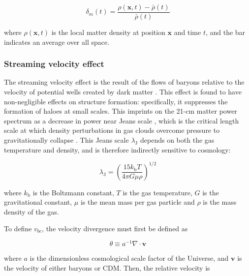 \documentclass[floats,floatfix,showpacs,amssymb,prd,superscriptaddress,nofootinbib, 11pt]{revtex4-2} %
\newcommand{\red}{\textcolor{red}}
\begin{document}
\begin{equation}
    \delta_m(t) = \frac{\rho(\textbf{x}, t) - \bar{\rho}(t)}{\bar{\rho}(t)}
    \label{eq:delta_m_definition}
\end{equation}

\noindent where $\rho(\textbf{x}, t)$ is the local matter density at position $\textbf{x}$ and time $t$, and the bar indicates an average over all space.

\subsubsection{Streaming velocity effect}
The streaming velocity effect is the result of the flows of baryons relative to the velocity of potential wells created by dark matter \citep{Tseliakhovich_Hirata_2010}. This effect is found to have non-negligible effects on structure formation: specifically, it suppresses the formation of haloes at small scales. This imprints on the 21-cm matter power spectrum as a decrease in power near Jeans scale \citep{Tseliakhovich_Hirata_2010}, which is the critical length scale at which density perturbations in gas clouds overcome pressure to gravitationally collapse \citep{Jeans_1902}. This Jeans scale $\lambda_\text{J}$ depends on both the gas temperature and density, and is therefore indirectly sensitive to cosmology:

\begin{equation}
    \lambda_\text{J} = \left( \frac{15 k_\text{b} T}{4 \pi G \mu \rho} \right) ^{1/2}
\end{equation}

\noindent where $k_\text{b}$ is the Boltzmann constant, $T$ is the gas temperature, $G$ is the gravitational constant, $\mu$ is the mean mass per gas particle and $\rho$ is the mass density of the gas.


To define $v_{bc}$, the velocity divergence must first be defined as 

\begin{equation}
    \theta \equiv a^{-1} \nabla \cdot \textbf{v}
    \label{eq:velocity_divergence}
\end{equation}

\noindent where $a$ is the dimensionless cosmological scale factor of the Universe, and $\textbf{v}$ is the velocity of either baryons or CDM. 
Then, the relative velocity is
\end{document}
